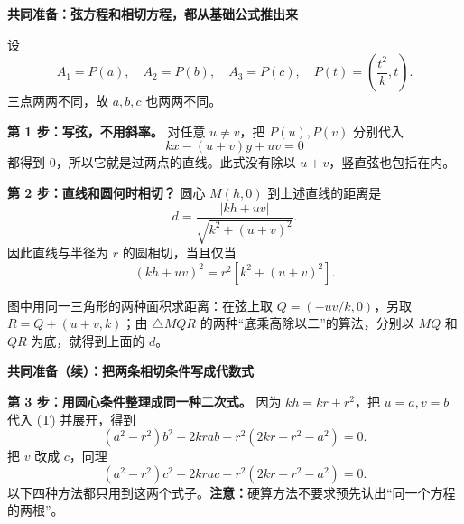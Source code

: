\clearpage
\begin{proofbox}
\textbf{共同准备：弦方程和相切方程，都从基础公式推出来}

设
\[
A_1=P(a),\quad A_2=P(b),\quad A_3=P(c),\quad
P(t)=\left(\frac{t^2}{k},t\right).
\]
三点两两不同，故 $a,b,c$ 也两两不同。

\textbf{第 1 步：写弦，不用斜率。} 对任意 $u\ne v$，把 $P(u),P(v)$ 分别代入
\[
kx-(u+v)y+uv=0
\]
都得到 $0$，所以它就是过两点的直线。此式没有除以 $u+v$，竖直弦也包括在内。

\textbf{第 2 步：直线和圆何时相切？} 圆心 $M(h,0)$ 到上述直线的距离是
\[
d=\frac{|kh+uv|}{\sqrt{k^2+(u+v)^2}}.
\]
因此直线与半径为 $r$ 的圆相切，当且仅当
\begin{equation}
\boxed{(kh+uv)^2=r^2[k^2+(u+v)^2].}\tag{T}
\end{equation}
\begin{center}

\end{center}
图中用同一三角形的两种面积求距离：在弦上取 $Q=(-uv/k,0)$，另取 $R=Q+(u+v,k)$；由 $\triangle MQR$ 的两种“底乘高除以二”的算法，分别以 $MQ$ 和 $QR$ 为底，就得到上面的 $d$。

\end{proofbox}
\clearpage
\begin{proofbox}
\textbf{共同准备（续）：把两条相切条件写成代数式}

\textbf{第 3 步：用圆心条件整理成同一种二次式。} 因为 $kh=kr+r^2$，把 $u=a,v=b$ 代入 (T) 并展开，得到
\begin{equation}
(a^2-r^2)b^2+2kra b+r^2(2kr+r^2-a^2)=0.\tag{1}
\end{equation}
把 $v$ 改成 $c$，同理
\begin{equation}
(a^2-r^2)c^2+2kra c+r^2(2kr+r^2-a^2)=0.\tag{2}
\end{equation}
以下四种方法都只用到这两个式子。\textbf{注意：}硬算方法不要求预先认出“同一个方程的两根”。
\end{proofbox}

